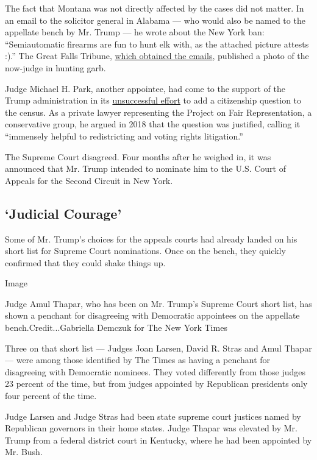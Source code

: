 The fact that Montana was not directly affected by the cases did not
matter. In an email to the solicitor general in Alabama --- who would
also be named to the appellate bench by Mr. Trump --- he wrote about the
New York ban: ``Semiautomatic firearms are fun to hunt elk with, as the
attached picture attests :).'' The Great Falls Tribune,
\href{https://www.greatfallstribune.com/story/news/local/2014/09/17/vandyke-politician-nature/15812491/}{which
obtained the emails}, published a photo of the now-judge in hunting
garb.

Judge Michael H. Park, another appointee, had come to the support of the
Trump administration in its
\href{https://www.nytimes3xbfgragh.onion/2019/06/27/us/politics/census-citizenship-question-supreme-court.html}{unsuccessful
effort} to add a citizenship question to the census. As a private lawyer
representing the Project on Fair Representation, a conservative group,
he argued in 2018 that the question was justified, calling it
``immensely helpful to redistricting and voting rights litigation.''

The Supreme Court disagreed. Four months after he weighed in, it was
announced that Mr. Trump intended to nominate him to the U.S. Court of
Appeals for the Second Circuit in New York.

\hypertarget{judicial-courage}{%
\subsection{`Judicial Courage'}\label{judicial-courage}}

Some of Mr. Trump's choices for the appeals courts had already landed on
his short list for Supreme Court nominations. Once on the bench, they
quickly confirmed that they could shake things up.

Image

Judge Amul Thapar, who has been on Mr. Trump's Supreme Court short list,
has shown a penchant for disagreeing with Democratic appointees on the
appellate bench.Credit...Gabriella Demczuk for The New York Times

Three on that short list --- Judges Joan Larsen, David R. Stras and Amul
Thapar --- were among those identified by The Times as having a penchant
for disagreeing with Democratic nominees. They voted differently from
those judges 23 percent of the time, but from judges appointed by
Republican presidents only four percent of the time.

Judge Larsen and Judge Stras had been state supreme court justices named
by Republican governors in their home states. Judge Thapar was elevated
by Mr. Trump from a federal district court in Kentucky, where he had
been appointed by Mr. Bush.

